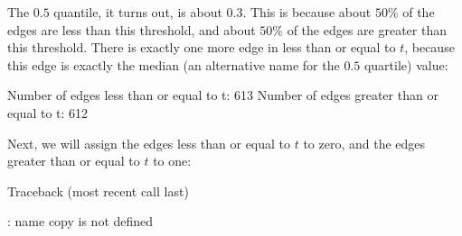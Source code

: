 \documentclass[letterpaper,10pt,english]{jupyterBook}
\begin{document}
\noindent{}

\sphinxAtStartPar
The \(0.5\) quantile, it turns out, is about \(0.3\). This is because about \(50\%\) of the edges are less than this threshold, and about \(50\%\) of the edges are greater than this threshold. There is exactly one more edge in less than or equal to \(t\), because this edge is exactly the median (an alternative name for the \(0.5\) quartile) value:

\begin{sphinxVerbatim}[commandchars=\\\{\}]
Number of edges less than or equal to t: 613
Number of edges greater than or equal to t: 612
\end{sphinxVerbatim}

\sphinxAtStartPar
Next, we will assign the edges less than or equal to \(t\) to zero, and the edges greater than or equal to \(t\) to one:

\begin{sphinxVerbatim}[commandchars=\\\{\}]
Traceback (most recent call last)
  
     
 
 \PYG{p}{[}  \PYG{p}{]}  
 \PYG{p}{[}  \PYG{p}{]}  

: name \PYGZsq{}copy\PYGZsq{} is not defined
\end{sphinxVerbatim}
\end{document}
